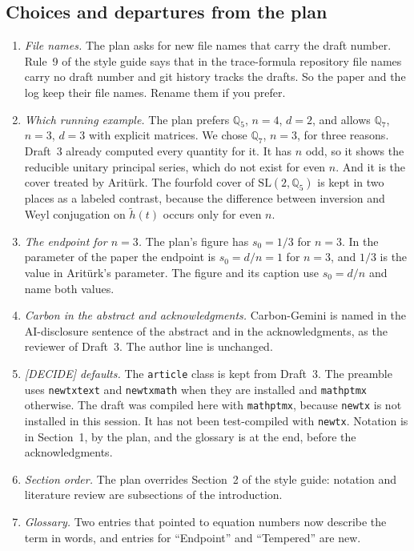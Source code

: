\documentclass[12pt,letterpaper]{article}
\newcommand{\hl}{\tilde h}
\newcommand{\Qq}{\mathbb Q}
\newcommand{\SL}{\mathrm{SL}}
\begin{document}
\subsection{Choices and departures from the plan}\label{subsec:choices}

\begin{enumerate}[leftmargin=*]
\item \emph{File names.} The plan asks for new file names that carry
  the draft number. Rule~9 of the style guide says that in the
  trace-formula repository file names carry no draft number and git
  history tracks the drafts. So the paper and the log keep their file
  names. Rename them if you prefer.
\item \emph{Which running example.} The plan prefers $\Qq_5$, $n=4$,
  $d=2$, and allows $\Qq_7$, $n=3$, $d=3$ with explicit matrices. We
  chose $\Qq_7$, $n=3$, for three reasons. Draft~3 already computed
  every quantity for it. It has $n$ odd, so it shows the reducible
  unitary principal series, which do not exist for even $n$. And it is
  the cover treated by Arit\"urk. The fourfold cover of $\SL(2,\Qq_5)$
  is kept in two places as a labeled contrast, because the difference
  between inversion and Weyl conjugation on $\hl(t)$ occurs only for
  even $n$.
\item \emph{The endpoint for $n=3$.} The plan's figure has $s_0=1/3$
  for $n=3$. In the parameter of the paper the endpoint is $s_0=d/n=1$
  for $n=3$, and $1/3$ is the value in Arit\"urk's parameter. The figure
  and its caption use $s_0=d/n$ and name both values.
\item \emph{Carbon in the abstract and acknowledgments.} Carbon-Gemini
  is named in the AI-disclosure sentence of the abstract and in the
  acknowledgments, as the reviewer of Draft~3. The author line is
  unchanged.
\item \emph{[DECIDE] defaults.} The \texttt{article} class is kept from
  Draft~3. The preamble uses \texttt{newtxtext} and \texttt{newtxmath}
  when they are installed and \texttt{mathptmx} otherwise. The draft was
  compiled here with \texttt{mathptmx}, because \texttt{newtx} is not
  installed in this session. It has not been test-compiled with
  \texttt{newtx}. Notation is in Section~1, by the plan, and the
  glossary is at the end, before the acknowledgments.
\item \emph{Section order.} The plan overrides Section~2 of the style
  guide: notation and literature review are subsections of the
  introduction.
\item \emph{Glossary.} Two entries that pointed to equation numbers
  now describe the term in words, and entries for ``Endpoint'' and
  ``Tempered'' are new.
\end{enumerate}
\end{document}

